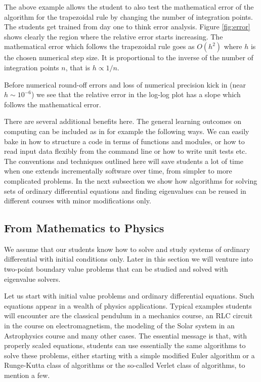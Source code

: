 \documentclass[graybox,envcountchap,sectrefs]{svmult}
\begin{document}
The above example allows the student to also test the mathematical
error of the algorithm for the trapezoidal rule by changing the number
of integration points. The students get trained from day one to think
error analysis. Figure \ref{fig:error}  shows clearly the region where the
relative error starts increasing.  The mathematical error which
follows the trapezoidal rule goes as $O(h^2)$ where $h$ is the chosen
numerical step size. It is proportional to the inverse of the number of integration points $n$, that is $h\propto 1/n$.

Before numerical round-off errors and loss of
numerical precision kick in (near $h\sim 10^{-6}$) we see that the
relative error in the log-log plot has a slope which follows the
mathematical error.

There are several additional benefits here. The general learning outcomes on computing can be included as in for example the following ways. We
can easily bake in how to structure a code in terms of
functions and modules, or how to read input data flexibly from the
command line or how to write unit tests etc.  The conventions and
techniques outlined here will save students a lot of time when one
extends incrementally software over time, from simpler to more
complicated problems. In the next subsection we show how algorithms
for solving sets of ordinary differential equations and finding
eigenvalues can be reused in different courses with minor
modifications only.



\subsection{From Mathematics to Physics}

We assume that our students know how to solve and study systems of
ordinary differential with initial conditions only. Later in this
section we will venture into two-point boundary value problems that
can be studied and solved with eigenvalue solvers.

Let us start with initial value problems and ordinary differential
equations. Such equations appear in a wealth of physics
applications. Typical examples students will encounter are the
classical pendulum in a mechanics course, an RLC circuit in the course on
electromagnetism, the modeling of the Solar system in an Astrophysics
course and many other cases.  The essential message is that, with
properly scaled equations, students can use essentially the
same algorithms to solve these problems, either starting with
a simple modified Euler algorithm or a Runge-Kutta class of
algorithms or the so-called Verlet class of algorithms, to mention a few.
\end{document}
